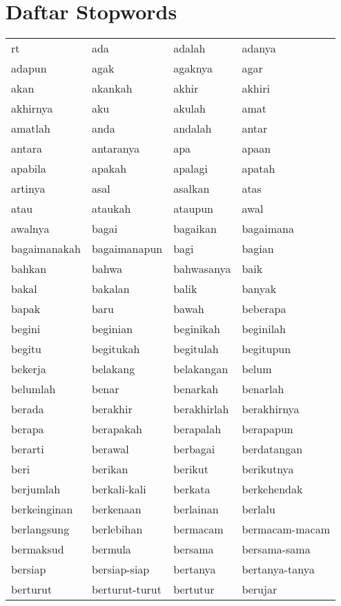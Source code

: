 \chapter{Daftar Stopwords}
\label{app:A}

\begin{tabular}{ | l | l | l | l | }

rt & ada & adalah & adanya\\
adapun & agak & agaknya & agar\\
akan & akankah & akhir & akhiri\\
akhirnya & aku & akulah & amat\\
amatlah & anda & andalah & antar\\
antara & antaranya & apa & apaan\\
apabila & apakah & apalagi & apatah\\
artinya & asal & asalkan & atas\\
atau & ataukah & ataupun & awal\\
awalnya & bagai & bagaikan & bagaimana\\
bagaimanakah & bagaimanapun & bagi & bagian\\
bahkan & bahwa & bahwasanya & baik\\
bakal & bakalan & balik & banyak\\
bapak & baru & bawah & beberapa\\
begini & beginian & beginikah & beginilah\\
begitu & begitukah & begitulah & begitupun\\
bekerja & belakang & belakangan & belum\\
belumlah & benar & benarkah & benarlah\\
berada & berakhir & berakhirlah & berakhirnya\\
berapa & berapakah & berapalah & berapapun\\
berarti & berawal & berbagai & berdatangan\\
beri & berikan & berikut & berikutnya\\
berjumlah & berkali-kali & berkata & berkehendak\\
berkeinginan & berkenaan & berlainan & berlalu\\
berlangsung & berlebihan & bermacam & bermacam-macam\\
bermaksud & bermula & bersama & bersama-sama\\
bersiap & bersiap-siap & bertanya & bertanya-tanya\\
berturut & berturut-turut & bertutur & berujar\\

\end{tabular}
